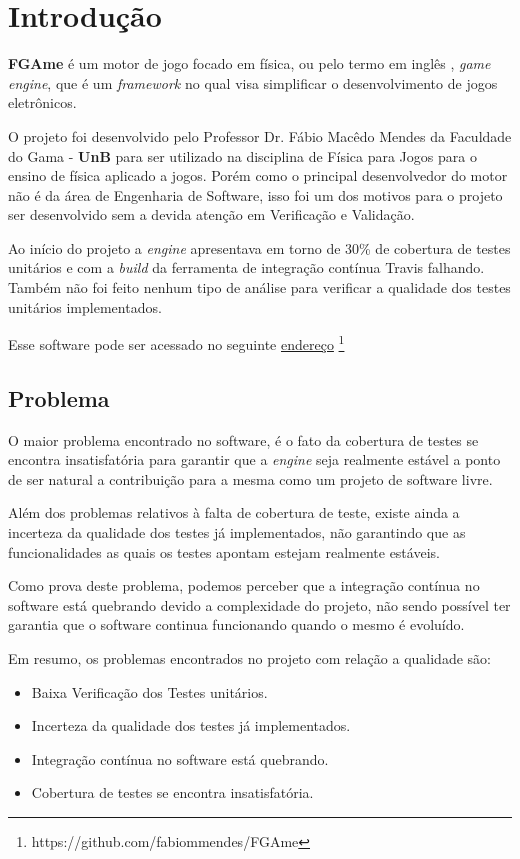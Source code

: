 \chapter[Introdução]{Introdução}
\textbf{FGAme} é um motor de jogo focado em física, ou pelo termo em inglês , \textit{game} \textit{engine}, que é um \textit{framework} no qual visa simplificar o desenvolvimento de jogos eletrônicos.

O projeto foi desenvolvido pelo Professor Dr. Fábio Macêdo Mendes da Faculdade do Gama - \textbf{UnB} para ser utilizado na disciplina de Física para Jogos para o ensino de física aplicado a jogos. Porém como o principal desenvolvedor do motor não é da área de Engenharia de Software, isso foi um dos motivos para o projeto ser desenvolvido sem a devida atenção em Verificação e Validação.

Ao início do projeto a \textit{engine} apresentava em torno de 30\% de cobertura de testes unitários e com a \textit{build} da ferramenta de integração contínua Travis falhando. Também não foi feito nenhum tipo de análise para verificar a qualidade dos testes unitários implementados.



Esse software pode ser acessado no seguinte \href{https://github.com/fabiommendes/FGAme}{endereço}%
\footnote{https://github.com/fabiommendes/FGAme}

\section{Problema}

O maior problema encontrado no software, é o fato da cobertura de testes se encontra insatisfatória para garantir que a \textit{engine} seja realmente estável a ponto de ser natural a contribuição para a mesma como um projeto de software livre.
    
Além dos problemas relativos à falta de cobertura de teste, existe ainda a incerteza da qualidade dos testes já implementados, não garantindo que as funcionalidades as quais os testes apontam estejam realmente estáveis.

Como prova deste problema, podemos perceber que a integração contínua no software está quebrando devido a complexidade do projeto, não sendo possível ter garantia que o software continua funcionando quando o mesmo é evoluído.

Em resumo, os problemas encontrados no projeto com relação a qualidade são:
\begin{itemize}
\item Baixa Verificação dos Testes unitários.
\item Incerteza da qualidade dos testes já implementados.
\item Integração contínua no software está quebrando.
\item Cobertura de testes se encontra insatisfatória.
\end{itemize}


